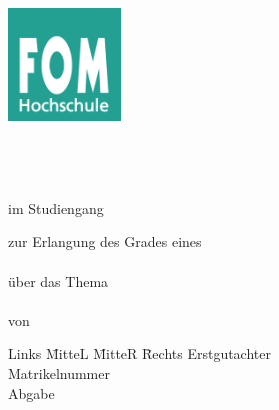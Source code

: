 \documentclass[12pt,oneside,titlepage,listof=totoc,bibliography=totoc]{scrartcl}
\begin{document}
\renewcommand{\refname}{Literaturverzeichnis}		%

\begin{titlepage}
	\begin{center}
		\vspace{1.5cm}
			\includegraphics[width=3cm]{abbildungen/fomLogo.jpg} \\
		\vspace{0.9cm}
		\Large \textbf{\myHochschulName}\\
		\large{\myHochschulStandort}\\ 
		
		\vspace{1.7cm}
		
		\large \textbf{\myThesisArt} \\
		\small{im Studiengang \myStudiengang}
		
		\vspace{2cm}
		
		
		
		\small{zur Erlangung des Grades eines}\\
		\large{\myAkademischerGrad}\\
		\vspace{2cm}
		\small{über das Thema}\\
		\large \textbf{\myTitel}\\
		\vspace{1.5cm}
		\small{von}\\
		\vspace{0.5cm}
		\large{\myAutor}
		
	\end{center}
	\normalsize
	\vfill
	\begin{tabbing}
		Links \=MitteL \= MitteR \= Rechts\kill
		Erstgutachter \> \> \>\myBetreuer\\
		Matrikelnummer \> \> \> \myMatrikelNr\\
		Abgabe \> \> \> \myAbgabeDatum
	\end{tabbing}
\end{titlepage}
\end{document}

